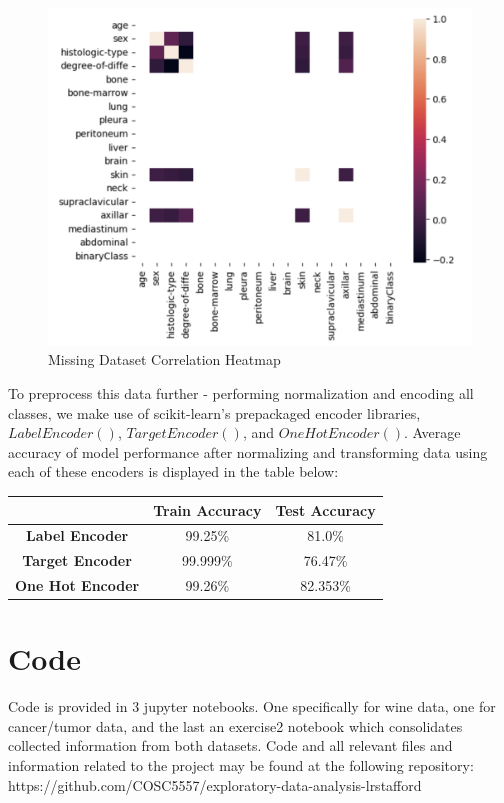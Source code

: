\documentclass[titlepage]{article}
\begin{document}
\begin{figure}
	\centering
	\includegraphics[width=0.65\linewidth]{img/missingheatmap.png}
	\caption{Missing Dataset Correlation Heatmap}
	\label{fig:missingheatmap}
\end{figure}

To preprocess this data further - performing normalization and encoding all classes, we make use of scikit-learn's \cite{scikitlearn} prepackaged encoder libraries, $LabelEncoder()$, $TargetEncoder()$, and $OneHotEncoder()$. Average accuracy of model performance after normalizing and transforming data using each of these encoders is displayed in the table below:  
\begin{center}
\begin{tabular}{ | c | c | c | }
	\hline
	  & \textbf{Train Accuracy} & \textbf{Test Accuracy} \\ 
	  \hline
	\textbf{Label Encoder} & 99.25\% & 81.0\% \\
	 \textbf{Target Encoder} & 99.999\% & 76.47\% \\
	 \textbf{One Hot Encoder} & 99.26\% & 82.353\%  \\
	\hline
\end{tabular}
\end{center}


\section*{Code}
Code is provided in 3 jupyter notebooks.  One specifically for wine data, one for cancer/tumor data, and the last an exercise2 notebook which consolidates collected information from both datasets.   Code and all relevant files and information related to the project may be found at the following repository:  https://github.com/COSC5557/exploratory-data-analysis-lrstafford 
\end{document}
